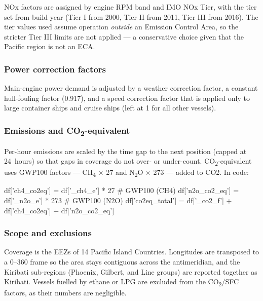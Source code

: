\documentclass[
  11pt,
]{article}
\newenvironment{Shaded}{}{}
\renewenvironment{Shaded}{\begin{tcolorbox}[breakable,boxrule=0.4pt,colback=gray!8,colframe=gray!50,arc=2pt,left=5pt,right=5pt,top=4pt,bottom=4pt]}{\end{tcolorbox}}
\begin{document}
NOx factors are assigned by engine RPM band and IMO NOx Tier, with the
tier set from build year (Tier I from 2000, Tier II from 2011, Tier III
from 2016). The tier values used assume operation \emph{outside} an
Emission Control Area, so the stricter Tier III limits are not applied
--- a conservative choice given that the Pacific region is not an ECA.

\subsubsection{Power correction
factors}\label{correction-factors}

Main-engine power demand is adjusted by a weather correction factor, a
constant hull-fouling factor (0.917), and a speed correction factor that
is applied only to large container ships and cruise ships (left at 1 for
all other vessels).

\subsubsection{Emissions and
CO\textsubscript{2}-equivalent}\label{emissions-and-co2eq}

Per-hour emissions are scaled by the time gap to the next position
(capped at 24~hours) so that gaps in coverage do not over- or
under-count. CO\textsubscript{2}-equivalent uses GWP100 factors ---
CH\textsubscript{4} $\times$ 27 and N\textsubscript{2}O $\times$ 273 ---
added to CO2. In code:

\begin{Shaded}
\begin{Highlighting}[]
df['ch4_co2eq']   = df['_ch4_e'] * 27      # GWP100 (CH4)
df['n2o_co2_eq']  = df['_n2o_e'] * 273     # GWP100 (N2O)
df['co2eq_total'] = df['_co2_f'] + df['ch4_co2eq'] + df['n2o_co2_eq']
\end{Highlighting}
\end{Shaded}

\subsubsection{Scope and exclusions}\label{scope-and-exclusions}

Coverage is the EEZs of 14 Pacific Island Countries. Longitudes are
transposed to a 0--360\textdegree{} frame so the area stays contiguous
across the antimeridian, and the Kiribati sub-regions (Phoenix, Gilbert,
and Line groups) are reported together as Kiribati. Vessels fuelled by
ethane or LPG are excluded from the CO\textsubscript{2}/SFC factors, as
their numbers are negligible.
\end{document}

